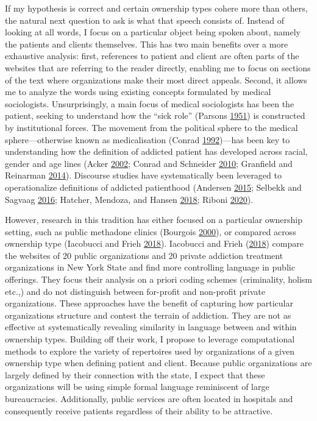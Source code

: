 \documentclass[
  12pt,
]{article}
\begin{document}
If my hypothesis is correct and certain ownership types cohere more than others, the natural next question to ask is what that speech consists of. Instead of looking at all words, I focus on a particular object being spoken about, namely the patients and clients themselves. This has two main benefits over a more exhaustive analysis: first, references to patient and client are often parts of the websites that are referring to the reader directly, enabling me to focus on sections of the text where organizations make their most direct appeals. Second, it allows me to analyze the words using existing concepts formulated by medical sociologists. Unsurprisingly, a main focus of medical sociologists has been the patient, seeking to understand how the ``sick role'' (Parsons \protect\hyperlink{ref-parsons1951}{1951}) is constructed by institutional forces. The movement from the political sphere to the medical sphere---otherwise known as medicalisation (Conrad \protect\hyperlink{ref-conrad1992}{1992})---has been key to understanding how the definition of addicted patient has developed across racial, gender and age lines (Acker \protect\hyperlink{ref-acker2002}{2002}; Conrad and Schneider \protect\hyperlink{ref-conrad2010}{2010}; Granfield and Reinarman \protect\hyperlink{ref-granfield2014}{2014}). Discourse studies have systematically been leveraged to operationalize definitions of addicted patienthood (Andersen \protect\hyperlink{ref-andersen2015}{2015}; Selbekk and Sagvaag \protect\hyperlink{ref-selbekk2016}{2016}; Hatcher, Mendoza, and Hansen \protect\hyperlink{ref-hatcher2018}{2018}; Riboni \protect\hyperlink{ref-riboni2020}{2020}).

\vspace{12pt}

However, research in this tradition has either focused on a particular ownership setting, such as public methadone clinics (Bourgois \protect\hyperlink{ref-bourgois2000}{2000}), or compared across ownership type (Iacobucci and Frieh \protect\hyperlink{ref-iacobucci2018}{2018}). Iacobucci and Frieh (\protect\hyperlink{ref-iacobucci2018}{2018}) compare the websites of 20 public organizations and 20 private addiction treatment organizations in New York State and find more controlling language in public offerings. They focus their analysis on a priori coding schemes (criminality, holism etc.,) and do not distinguish between for-profit and non-profit private organizations. These approaches have the benefit of capturing how particular organizations structure and contest the terrain of addiction. They are not as effective at systematically revealing similarity in language between and within ownership types. Building off their work, I propose to leverage computational methods to explore the variety of repertoires used by organizations of a given ownership type when defining patient and client. Because public organizations are largely defined by their connection with the state, I expect that these organizations will be using simple formal language reminiscent of large bureaucracies. Additionally, public services are often located in hospitals and consequently receive patients regardless of their ability to be attractive.
\end{document}

